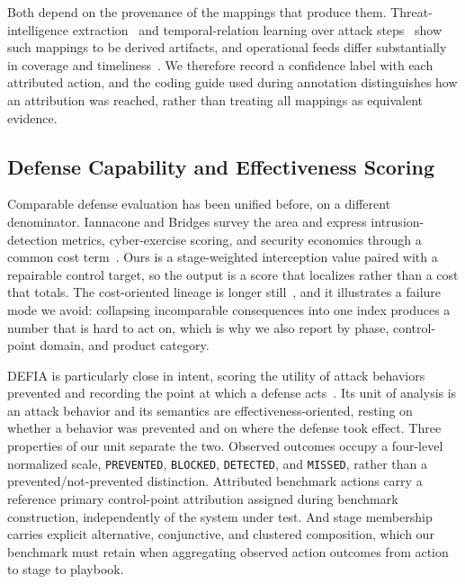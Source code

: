 Both depend on the provenance of the mappings that produce them. Threat-intelligence extraction~\cite{liao2016ioc} and temporal-relation learning over attack steps~\cite{shen2019attack2vec} show such mappings to be derived artifacts, and operational feeds differ substantially in coverage and timeliness~\cite{li2019tealeaves}. We therefore record a confidence label with each attributed action, and the coding guide used during annotation distinguishes how an attribution was reached, rather than treating all mappings as equivalent evidence.

\subsection{Defense Capability and Effectiveness Scoring}
\label{subsec:rw-scoring}

Comparable defense evaluation has been unified before, on a different denominator. Iannacone and Bridges survey the area and express intrusion-detection metrics, cyber-exercise scoring, and security economics through a common cost term~\cite{iannacone2020quantifiable}. Ours is a stage-weighted interception value paired with a repairable control target, so the output is a score that localizes rather than a cost that totals. The cost-oriented lineage is longer still~\cite{butler2002saem,gordon2002economics}, and it illustrates a failure mode we avoid: collapsing incomparable consequences into one index produces a number that is hard to act on, which is why we also report by phase, control-point domain, and product category.

DEFIA is particularly close in intent, scoring the utility of attack behaviors prevented and recording the point at which a defense acts~\cite{liu2023defia}. Its unit of analysis is an attack behavior and its semantics are effectiveness-oriented, resting on whether a behavior was prevented and on where the defense took effect. Three properties of our unit separate the two. Observed outcomes occupy a four-level normalized scale, \texttt{PREVENTED}, \texttt{BLOCKED}, \texttt{DETECTED}, and \texttt{MISSED}, rather than a prevented/not-prevented distinction. Attributed benchmark actions carry a reference primary control-point attribution assigned during benchmark construction, independently of the system under test. And stage membership carries explicit alternative, conjunctive, and clustered composition, which our benchmark must retain when aggregating observed action outcomes from action to stage to playbook.

